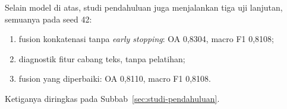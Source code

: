 Selain model di atas, studi pendahuluan juga menjalankan tiga uji lanjutan, semuanya
pada seed 42:
\begin{enumerate}
  \item fusion konkatenasi tanpa \textit{early stopping}: OA 0,8304, macro F1 0,8108;
  \item diagnostik fitur cabang teks, tanpa pelatihan;
  \item fusion yang diperbaiki: OA 0,8110, macro F1 0,8108.
\end{enumerate}
Ketiganya diringkas pada Subbab~\ref{sec:studi-pendahuluan}.
